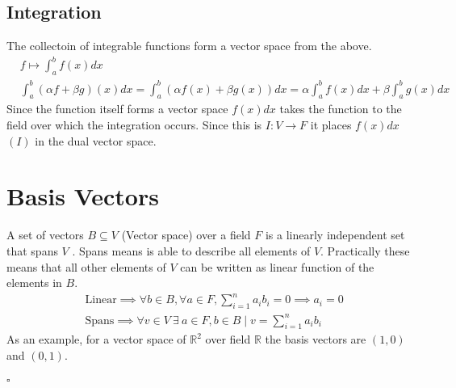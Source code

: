 \documentclass[a4paper]{article}
\begin{document}
\subsection{Integration \cite{wiki:integration}}
The collectoin of integrable functions form a vector space from the above.
\begin{align}
  &f \mapsto \int_a^b f(x) dx\\
  &\int_a^b (\alpha f + \beta g)(x) dx = \int_a^b (\alpha f(x)+\beta g(x)) dx=\alpha \int_a^b f(x)dx + \beta \int_a^b g(x)dx
\end{align}
Since the function itself forms a vector space $f(x) dx$ takes the function to the field over which the integration occurs. Since this is $I:V \to F$ it places $f(x)dx$ $(I)$ in the dual vector space.
\section {Basis Vectors}
A set of vectors $B \subseteq V$ (Vector space) over a field $F$ is a linearly independent set that spans $V$ \cite{wiki:basis}. Spans means is able to describe all elements of $V$. Practically these means that all other elements of $V$ can be written as linear function of the elements in $B$.
\begin{align}
  &\text{Linear}\implies \forall b \in B, \forall a \in F, \sum_{i=1}^n a_i b_i =0 \implies a_i = 0\\
  &\text{Spans}\implies \forall v \in V \: \exists \: a \in F, b \in B \mid v = \sum_{i=1}^n a_i b_i
\end{align}
As an example, for a vector space of $\mathbb{R}^2$ over field $\mathbb{R}$ the basis vectors are $(1,0)$ and $(0,1)$.
\\ \\
$\square$


\end{document}
